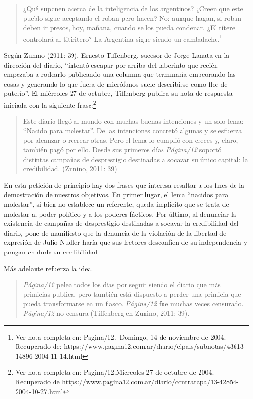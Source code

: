 \begin{quote}
¿Qué suponen acerca de la inteligencia de los argentinos? ¿Creen que este pueblo sigue aceptando el roban pero hacen? No: aunque hagan, si roban deben ir presos, hoy, mañana, cuando se los pueda condenar. ¿El títere controlará al titiritero? La Argentina sigue siendo un cambalache.\footnote{Ver nota completa en: Página/12.~Domingo, 14 de noviembre de 2004. Recuperado de: https://www.pagina12.com.ar/diario/elpais/subnotas/43613-14896-2004-11-14.html}
\end{quote}

Según Zunino (2011: 39), Ernesto Tiffenberg, sucesor de Jorge Lanata en la dirección del diario, ``intentó escapar por arriba del laberinto que recién empezaba a rodearlo publicando una columna que terminaría empeorando las cosas y generando lo que fuera de micrófonos suele describirse como flor de puterío''. El miércoles 27 de octubre, Tiffenberg publica su nota de respuesta iniciada con la siguiente frase:\footnote{Ver nota completa en: Página/12.Miércoles 27 de octubre de 2004. Recuperado de https://www.pagina12.com.ar/diario/contratapa/13-42854-2004-10-27.html}

\begin{quote}
Este diario llegó al mundo con muchas buenas intenciones y un solo lema: ``Nacido para molestar''. De las intenciones concretó algunas y se esfuerza por alcanzar o recrear otras. Pero el lema lo cumplió con creces y, claro, también pagó por ello. Desde sus primeros días \emph{Página/12} soportó distintas campañas de desprestigio destinadas a socavar su único capital: la credibilidad. (Zunino, 2011: 39)
\end{quote}

En esta petición de principio hay dos frases que interesa resaltar a los fines de la demostración de nuestros objetivos. En primer lugar, el lema ``nacidos para molestar'', si bien no establece un referente, queda implícito que se trata de molestar al poder político y a los poderes fácticos. Por último, al denunciar la existencia de campañas de desprestigio destinadas a socavar la credibilidad del diario, pone de manifiesto que la denuncia de la violación de la libertad de expresión de Julio Nudler haría que sus lectores desconfíen de su independencia y pongan en duda su credibilidad.

Más adelante refuerza la idea.

\begin{quote}
\emph{Página/12} pelea todos los días por seguir siendo el diario que más primicias publica, pero también está dispuesto a perder una primicia que pueda transformarse en un fiasco. \emph{Página/12} fue muchas veces censurado. \emph{Página/12} no censura (Tiffenberg en Zunino, 2011: 39).
\end{quote}

